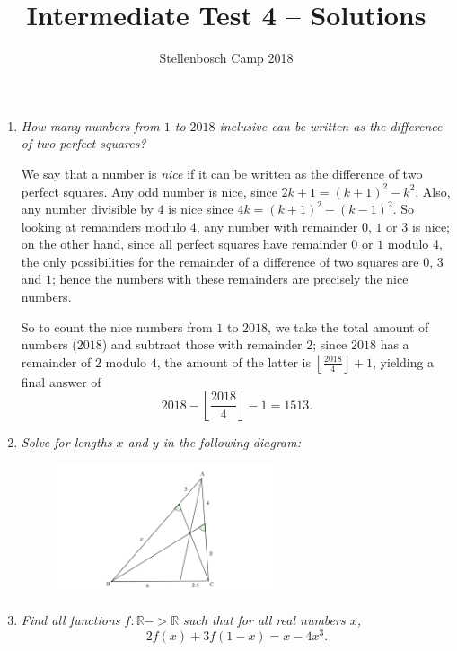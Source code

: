 \documentclass{article}
\title{Intermediate Test 4 -- Solutions}
\author{Stellenbosch Camp 2018}
\date{\vspace{-12pt}}
\newcommand{\floor}[1]{\ensuremath{\left\lfloor#1\right\rfloor}}
\begin{document}
\maketitle

\begin{enumerate}[1.]

\item %
\textit{How many numbers from $1$ to $2018$ inclusive can be written as the difference of two perfect squares?}

We say that a number is \emph{nice} if it can be written as the difference of two perfect squares. Any odd number is nice, since $2k+1 = (k+1)^2 -k^2$. Also, any number divisible by $4$ is nice since $4k = (k+1)^2 -(k-1)^2$. So looking at remainders modulo $4$, any number with remainder $0$, $1$ or $3$ is nice; on the other hand, since all perfect squares have remainder $0$ or $1$ modulo 4, the only possibilities for the remainder of a difference of two squares are $0$, $3$ and $1$; hence the numbers with these remainders are precisely the nice numbers.

So to count the nice numbers from $1$ to $2018$, we take the total amount of numbers ($2018$) and subtract those with remainder $2$; since $2018$ has a remainder of $2$ modulo $4$, the amount of the latter is $\floor{\frac{2018}{4}} +1$, yielding a final answer of \[ 2018 - \floor{\frac{2018}{4}} -1 = 1513. \]


\vspace{12pt}
\item %
\textit{Solve for lengths $x$ and $y$ in the following diagram:}

\begin{figure}[h]
\centering
\includegraphics[width=0.6\textwidth]{GeogebraTest4.png}
\end{figure}


\vspace{6pt}
\item %
\textit{Find all functions $f : \mathbb{R} -> \mathbb{R}$ such that for all real numbers $x$, \[ 2 f(x) +3 f(1-x) = x-4x^3. \]}



\end{enumerate}
\end{document}
